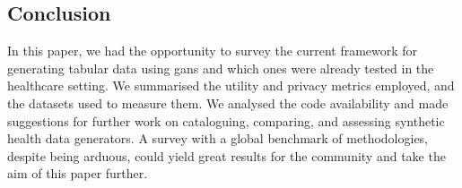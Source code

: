 \subsection{Conclusion}
In this paper, we had the opportunity to survey the current framework for generating tabular data using \acp{gan} and which ones were already tested in the healthcare setting. We summarised the utility and privacy metrics employed, and the datasets used to measure them. We analysed the code availability and made suggestions for further work on cataloguing, comparing, and assessing synthetic health data generators. A survey with a global benchmark of methodologies, despite being arduous, could yield great results for the community and take the aim of this paper further.